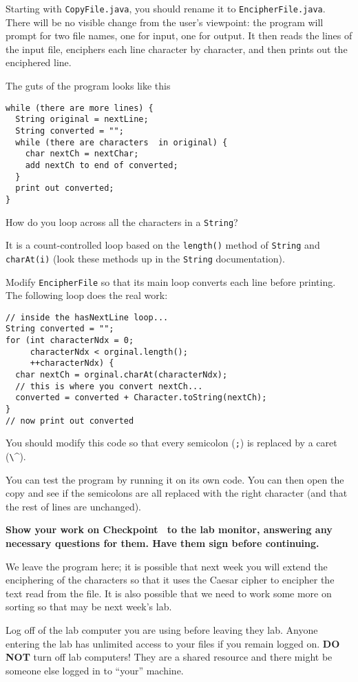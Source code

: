 \documentclass[12pt,oneside]{memoir}
\newcommand\code[1]{\lstinline^#1^}
\newcommand\fname[1]{\texttt{#1}}
\newenvironment{Checkpoint}[1]{%
  \begin{Exercise}[name={Checkpoint},title={#1}]}{%
  \end{Exercise}%
  \textbf{Show your work on Checkpoint~\theExercise{} to the lab monitor, %
    answering any necessary questions for them.  Have them sign before continuing.}}
\begin{document}
\begin{Checkpoint}{EncipherFile.java}
Starting with \fname{CopyFile.java}, you should rename it to
\code{EncipherFile.java}. There will be no visible change from the
user's viewpoint: the program will prompt for two file names, one for
input, one for output. It then reads the lines of the input file,
enciphers each line character by character, and then prints out the
enciphered line.

The guts of the program looks like this
\begin{lstlisting}
while (there are more lines) {
  String original = nextLine;
  String converted = "";
  while (there are characters  in original) {
    char nextCh = nextChar;
    add nextCh to end of converted;
  }
  print out converted;
}
\end{lstlisting}

How do you loop across all the characters in a \code{String}? 

It is a count-controlled loop based on the \code{length()} method of
\code{String} and \code{charAt(i)} (look these methods up in the
\code{String} documentation). 

Modify \code{EncipherFile} so that its main loop converts each line
before printing. The following loop does the real work:

  \begin{lstlisting}
// inside the hasNextLine loop...
String converted = "";
for (int characterNdx = 0; 
     characterNdx < orginal.length(); 
     ++characterNdx) {    
  char nextCh = orginal.charAt(characterNdx);
  // this is where you convert nextCh...
  converted = converted + Character.toString(nextCh);
}
// now print out converted
  \end{lstlisting}

You should modify this code so that every semicolon (\code{;}) is
replaced by a caret (\code{\^}). 

You can test the program by running it on its own code. You can then
open the copy and see if the semicolons are all replaced with the
right character (and that the rest of lines are unchanged). 
\end{Checkpoint}

We leave the program here; it is possible that next week you will
extend the enciphering of the characters so that it uses the Caesar
cipher to encipher the text read from the file. It is also possible
that we need to work some more on sorting so that may be next week's
lab. 

\Large{Log off of the lab computer you are using before leaving they
  lab. Anyone entering the lab has unlimited access to your files if
  you remain logged on. \textbf{DO NOT} turn off lab computers! They
  are a shared resource and there might be someone else logged in to
  ``your'' machine.}
\end{document}
